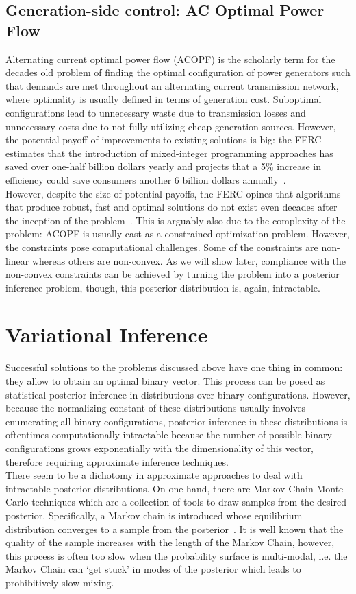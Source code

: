 \documentclass[11pt]{cmuthesis} %
\begin{document}
\section{Generation-side control: AC Optimal Power Flow}

Alternating current optimal power flow (ACOPF) is the scholarly term for the decades old problem of finding the optimal configuration of power generators such that demands are met throughout an alternating current transmission network, where optimality is usually defined in terms of generation cost. Suboptimal configurations lead to unnecessary waste due to transmission losses and unnecessary costs due to not fully utilizing cheap generation sources. However, the potential payoff of improvements to existing solutions is big: the FERC estimates that the introduction of mixed-integer programming approaches has saved over one-half billion dollars yearly and projects that a 5\% increase in efficiency could save consumers another 6 billion dollars annually~\cite{ferc2012history}.\\
However, despite the size of potential payoffs, the FERC opines that algorithms that produce robust, fast and optimal solutions do not exist even decades after the inception of the problem~\cite{ferc2012history}. This is arguably also due to the complexity of the problem: ACOPF is usually cast as a constrained optimization problem. However, the constraints pose computational challenges. Some of the constraints are non-linear whereas others are non-convex. As we will show later, compliance with the non-convex constraints can be achieved by turning the problem into a posterior inference problem, though, this posterior distribution is, again, intractable.


\chapter{Variational Inference}
Successful solutions to the problems discussed above have one thing in common: they allow to obtain an optimal binary vector. This process can be posed as statistical posterior inference in distributions over binary configurations. However, because the normalizing constant of these distributions usually involves enumerating all binary configurations, posterior inference in these distributions is oftentimes computationally intractable because the number of possible binary configurations grows exponentially with the dimensionality of this vector, therefore requiring approximate inference techniques.\\
There seem to be a dichotomy in approximate approaches to deal with intractable posterior distributions. On one hand, there are Markov Chain Monte Carlo techniques which are a collection of tools to draw samples from the desired posterior. Specifically, a Markov chain is introduced whose equilibrium distribution converges to a sample from the posterior~\cite{geman1987stochastic}. It is well known that the quality of the sample increases with the length of the Markov Chain, however, this process is often too slow when the probability surface is multi-modal, i.e. the Markov Chain can `get stuck' in modes of the posterior which leads to prohibitively slow mixing. 
\end{document}

